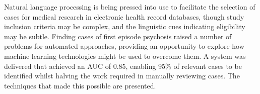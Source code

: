 Natural language processing is being pressed into use to facilitate the selection of cases for medical research in electronic health record databases, though study inclusion criteria may be complex, and the linguistic cues indicating eligibility may be subtle. Finding cases of first episode psychosis raised a number of problems for automated approaches, providing an opportunity to explore how machine learning technologies might be used to overcome them. A system was delivered that achieved an AUC of 0.85, enabling 95\% of relevant cases to be identified whilst halving the work required in manually reviewing cases. The techniques that made this possible are presented.

